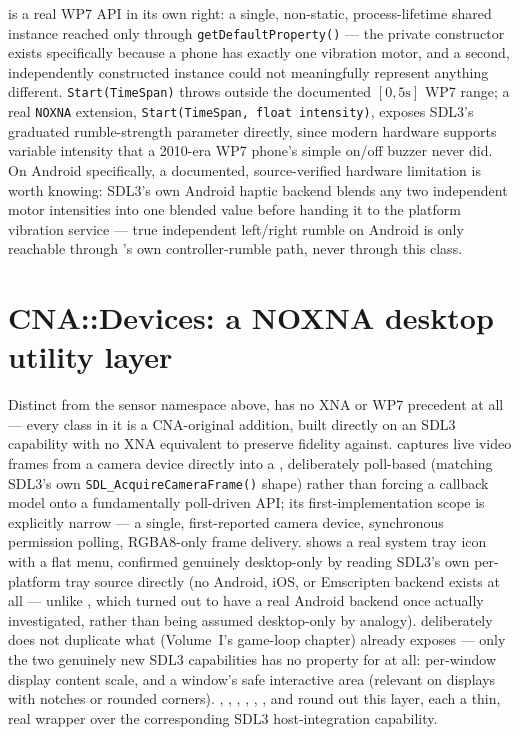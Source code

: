  is a real WP7 API in its own right: a single, non-static,
process-lifetime shared instance reached only through \texttt{getDefaultProperty()} --- the
private constructor exists specifically because a phone has exactly one vibration motor, and
a second, independently constructed instance could not meaningfully represent anything
different. \texttt{Start(TimeSpan)} throws outside the documented $[0, 5\text{s}]$ WP7 range;
a real \texttt{NOXNA} extension, \texttt{Start(TimeSpan, float intensity)}, exposes SDL3's
graduated rumble-strength parameter directly, since modern hardware supports variable
intensity that a 2010-era WP7 phone's simple on/off buzzer never did. On Android specifically,
a documented, source-verified hardware limitation is worth knowing: SDL3's own Android haptic
backend blends any two independent motor intensities into one blended value before handing it
to the platform vibration service --- true independent left/right rumble on Android is only
reachable through 's own controller-rumble path, never through this class.

\section{CNA::Devices: a NOXNA desktop utility layer}

Distinct from the sensor namespace above,  has no XNA or WP7 precedent at
all --- every class in it is a CNA-original addition, built directly on an SDL3 capability
with no XNA equivalent to preserve fidelity against.  captures live video
frames from a camera device directly into a , deliberately poll-based
(matching SDL3's own \texttt{SDL\_AcquireCameraFrame()} shape) rather than forcing a
callback model onto a fundamentally poll-driven API; its first-implementation scope is
explicitly narrow --- a single, first-reported camera device, synchronous permission
polling, RGBA8-only frame delivery.  shows a real system tray icon with
a flat menu, confirmed genuinely desktop-only by reading SDL3's own per-platform tray source
directly (no Android, iOS, or Emscripten backend exists at all --- unlike
, which turned out to have a real Android backend once actually
investigated, rather than being assumed desktop-only by analogy). 
deliberately does not duplicate what  (Volume~I's game-loop chapter)
already exposes --- only the two genuinely new SDL3 capabilities
 has no property for at all: per-window display content scale, and a
window's safe interactive area (relevant on displays with notches or rounded corners).
, , , ,
, , and  round out this layer,
each a thin, real wrapper over the corresponding SDL3 host-integration capability.

